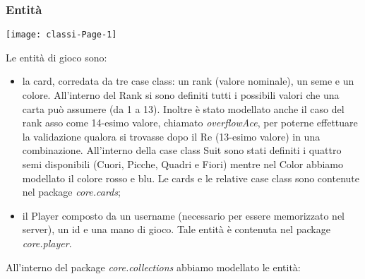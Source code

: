 \subsubsection{Entità}
\begin{center}
    \texttt{[image: classi-Page-1]}
\end{center}
Le entità di gioco sono:
\begin{itemize}
    \item la card, corredata da tre case class: un rank (valore nominale), un seme e un colore.
    All’interno del Rank si sono definiti tutti i possibili valori che una carta può assumere (da 1 a 13). Inoltre è stato modellato anche il caso del rank asso come 14-esimo valore, chiamato \textit{overflowAce}, per poterne effettuare la validazione qualora si trovasse dopo il Re (13-esimo valore) in una combinazione. 
    All’interno della case class Suit sono stati definiti i quattro semi disponibili (Cuori, Picche, Quadri e Fiori) mentre nel Color abbiamo modellato il colore rosso e blu. Le cards e le relative case class sono contenute nel package \textit{core.cards};
    \item il Player composto da un username (necessario per essere memorizzato nel server), un id e  una mano di gioco. Tale entità è contenuta nel package \textit{core.player}.
\end{itemize}
All’interno del package \textit{core.collections} abbiamo modellato le entità:
